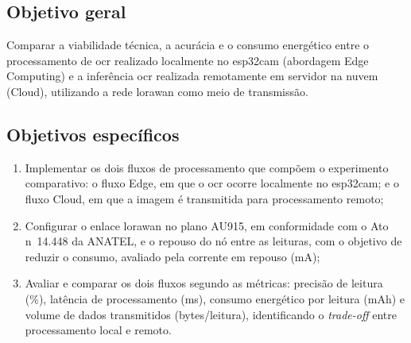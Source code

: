 \subsection{Objetivo geral}

Comparar a viabilidade técnica, a acurácia e o consumo energético entre o processamento de \gls{ocr} realizado localmente no \gls{esp32cam} (abordagem Edge Computing) e a inferência \gls{ocr} realizada remotamente em servidor na nuvem (Cloud), utilizando a rede \gls{lorawan} como meio de transmissão.

\subsection{Objetivos específicos}

\begin{enumerate}
    \item Implementar os dois fluxos de processamento que compõem o experimento comparativo: o fluxo Edge, em que o \gls{ocr} ocorre localmente no \gls{esp32cam}; e o fluxo Cloud, em que a imagem é transmitida para processamento remoto; %
    \item Configurar o enlace \gls{lorawan} no plano AU915, em conformidade com o Ato n\textordmasculine~14.448 da ANATEL, e o repouso do nó entre as leituras, com o objetivo de reduzir o consumo, avaliado pela corrente em repouso (mA); %
    \item Avaliar e comparar os dois fluxos segundo as métricas: precisão de leitura (\%), latência de processamento (ms), consumo energético por leitura (mAh) e volume de dados transmitidos (bytes/leitura), identificando o \textit{trade-off} entre processamento local e remoto. %
\end{enumerate}